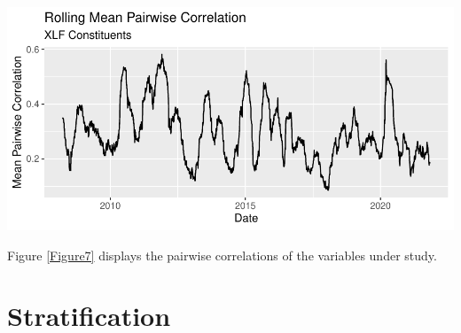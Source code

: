 \documentclass[11pt,preprint, authoryear]{elsarticle}
\let\origfigure\figure
\let\endorigfigure\endfigure
\renewenvironment{figure}[1][2] {
    \expandafter\origfigure\expandafter[H]
} {
    \endorigfigure
}
\numberwithin{equation}{section}
\numberwithin{figure}{section}
\numberwithin{table}{section}
\begin{document}
\begin{figure}[H]

{\centering \includegraphics{Question4_files/figure-latex/Figure7-1} 

}

\caption{Pairwise correlations \label{Figure7}}\label{fig:Figure7}
\end{figure}

Figure \ref{Figure7} displays the pairwise correlations of the variables
under study.

\hypertarget{stratification}{%
\section{\texorpdfstring{Stratification
\label{strat}}{Stratification }}\label{stratification}}
\end{document}
